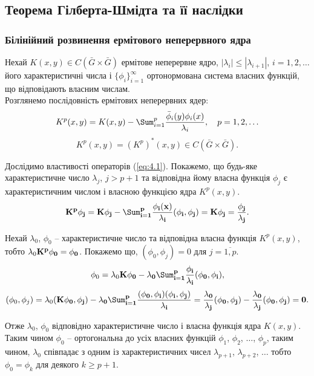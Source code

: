 \subsection{Теорема Гілберта-Шмідта та її наслідки}

\subsubsection{Білінійний розвинення ермітового неперервного ядра}

Нехай $K(x, y) \in C(\bar G \times \bar G)$ ермітове неперервне ядро, $|\lambda_i| \le |\lambda_{i + 1}|$, $i = 1, 2, \ldots$ його характеристичні числа і $\{\phi_i\}_{i = 1}^\infty$ ортонормована система власних функцій, що відповідають власним числам. \\

Розглянемо послідовність ермітових неперервних ядер:
\begin{equation}
	\label{eq:4.1}
	K^p(x, y) = K(x, y) - \Sum_{i = 1}^p \dfrac{\bar \phi_i(y) \phi_i(x)}{\lambda_i}, \quad p = 1, 2, \ldots
\end{equation}
\[ K^p(x, y) = (K^p)^*(x, y) \in  C(\bar G \times \bar G). \]

Дослідимо властивості операторів (\ref{eq:4.1}). Покажемо, що будь-яке характеристичне число $\lambda_j$, $j > p + 1$ та відповідна йому власна функція $\phi_j$ є характеристичним числом і власною функцією ядра $K^p(x,y)$.
\begin{equation}
	\label{eq:4.2}
	\bf{K}^p \phi_j = \bf{K} \phi_j - \Sum_{i = 1}^p \dfrac{\phi_i(x)}{\lambda_i} (\phi_i, \phi_j) = \bf{K} \phi_j = \dfrac{\phi_j}{\lambda_j}.
\end{equation}

Нехай $\lambda_0$, $\phi_0$ -- характеристичне число та відповідна власна функція $K^p(x, y)$, тобто $\lambda_0 \bf{K}^p \phi_0 = \phi_0$. Покажемо що, $(\phi_0, \phi_j) = 0$ для $j = \overline{1, p}$.
\[ \phi_0 = \lambda_0 \bf{K} \phi_0 - \lambda_0 \Sum_{i = 1}^p \dfrac{\phi_i}{\lambda_i} (\phi_0, \phi_i), \]
\[ (\phi_0, \phi_j) = \lambda_0 (\bf{K} \phi_0, \phi_j) - \lambda_0 \Sum_{i = 1}^p \dfrac{(\phi_0, \phi_i)(\phi_i, \phi_j)}{\lambda_i} = \dfrac{\lambda_0}{\lambda_j} (\phi_0, \phi_j) - \dfrac{\lambda_0}{\lambda_j} (\phi_0, \phi_j) = 0. \]

Отже $\lambda_0$, $\phi_0$ відповідно характеристичне число і власна функція ядра $K(x, y)$. \\

Таким чином $\phi_0$ -- ортогональна до усіх власних функцій $\phi_1$, $\phi_2$, $\ldots$, $\phi_p$, таким чином, $\lambda_0$ співпадає з одним із характеристичних чисел $\lambda_{p + 1}$, $\lambda_{p + 2}$, $\ldots$ тобто $\phi_0 = \phi_k$ для деякого $k \ge p + 1$. \\

